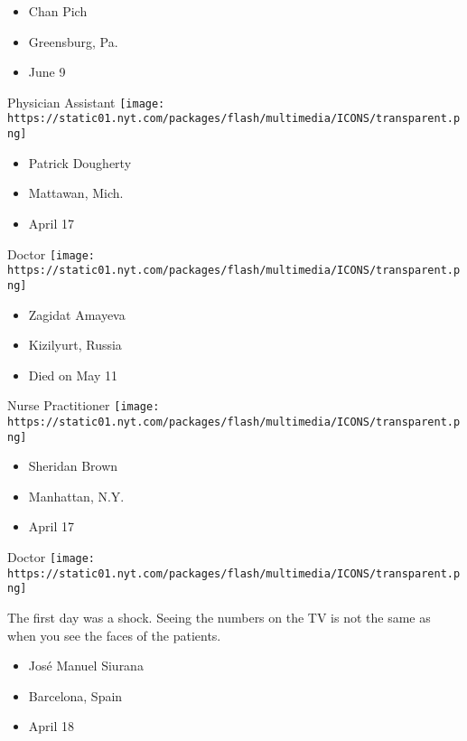 \begin{itemize}
\tightlist
\item
  Chan Pich
\item
  Greensburg, Pa.
\item
  June 9
\end{itemize}

\protect\hyperlink{item-patrick-dougherty}{}

Physician Assistant
\texttt{[image: https://static01.nyt.com/packages/flash/multimedia/ICONS/transparent.png]}

\begin{itemize}
\tightlist
\item
  Patrick Dougherty
\item
  Mattawan, Mich.
\item
  April 17
\end{itemize}

\protect\hyperlink{item-zagidat-amayeva}{}

Doctor
\texttt{[image: https://static01.nyt.com/packages/flash/multimedia/ICONS/transparent.png]}

\begin{itemize}
\tightlist
\item
  Zagidat Amayeva
\item
  Kizilyurt, Russia
\item
  Died on May 11
\end{itemize}

\protect\hyperlink{item-sheridan-brown}{}

Nurse Practitioner
\texttt{[image: https://static01.nyt.com/packages/flash/multimedia/ICONS/transparent.png]}

\begin{itemize}
\tightlist
\item
  Sheridan Brown
\item
  Manhattan, N.Y.
\item
  April 17
\end{itemize}

\protect\hyperlink{item-jose-manuel-siurana}{}

Doctor
\texttt{[image: https://static01.nyt.com/packages/flash/multimedia/ICONS/transparent.png]}

The first day was a shock. Seeing the numbers on the TV is not the same
as when you see the faces of the patients.

\begin{itemize}
\tightlist
\item
  José Manuel Siurana
\item
  Barcelona, Spain
\item
  April 18
\end{itemize}

